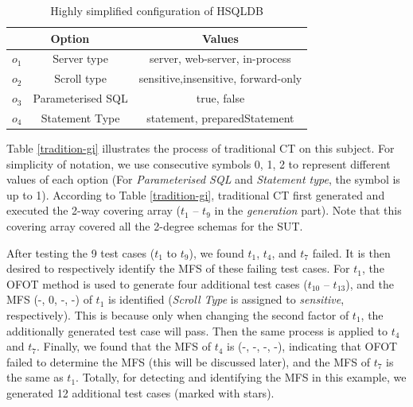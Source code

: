 \documentclass[journal,12pt,onecolumn,draftclsnofoot,]{IEEEtran}
\begin{document}

\begin{table}[ht]
\caption{Highly simplified configuration of HSQLDB}
\label{tomcat-simplifiy}
\centering
\begin{tabular}{cc|ccccc}
 \hline
 \multicolumn{2}{c}{\bfseries Option} & \multicolumn{5}{c}{\bfseries Values} \\  \hline
$o_{1}$ & Server type & \multicolumn{5}{c}{ server, web-server, in-process} \\
$o_{2}$ & Scroll type & \multicolumn{5}{c}{ sensitive,insensitive, forward-only} \\
$o_{3}$ & Parameterised SQL & \multicolumn{5}{c}{true, false} \\
$o_{4}$ & Statement Type & \multicolumn{5}{c}{ statement, preparedStatement} \\
 \hline
\end{tabular}
\end{table}


Table \ref{tradition-gi} illustrates the process of traditional CT on this subject. For simplicity of notation, we use consecutive symbols 0, 1, 2 to represent different values of each option (For \emph{Parameterised SQL} and \emph{Statement type}, the symbol is up to 1). According to Table \ref{tradition-gi}, traditional CT first generated and executed the 2-way covering array ($t_{1}$ -- $t_{9}$ in the \emph{generation} part). Note that this covering array covered all the 2-degree schemas for the SUT.

After testing the 9 test cases ($t_{1}$ to $t_{9}$),  we found $t_{1}$, $t_{4}$, and $t_{7}$ failed. It is then desired to respectively identify the MFS of these failing test cases. For $t_{1}$, the OFOT method is used to generate four additional test cases ($t_{10}$ -- $t_{13}$), and the MFS (-, 0, -, -) of $t_{1}$ is identified (\emph{Scroll Type} is assigned to \emph{sensitive}, respectively). This is because only when changing the second factor of $t_{1}$, the additionally generated test case will pass. Then the same process is applied to $t_{4}$ and $t_{7}$. Finally, we found that the MFS of $t_{4}$ is (-, -, -, -), indicating that OFOT failed to determine the MFS (this will be discussed later), and the MFS of $t_{7}$ is the same as $t_{1}$. Totally, for detecting and identifying the MFS in this example, we generated 12 additional test cases (marked with stars).
\end{document}
